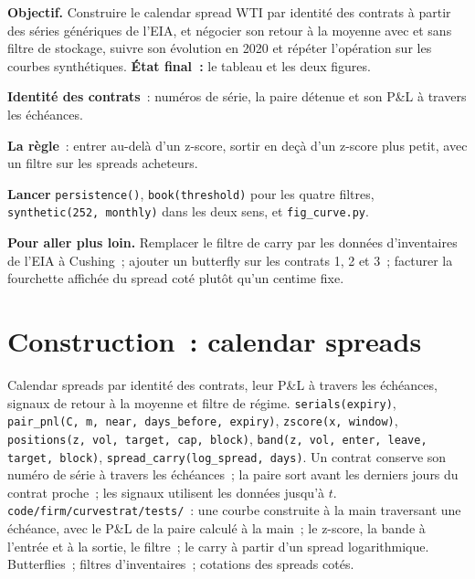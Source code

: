 \begin{tutorial}
\textbf{Objectif.} Construire le calendar spread WTI par identité des contrats à partir des séries génériques de l'EIA, et négocier son retour à la moyenne avec et sans
filtre de stockage, suivre son évolution en 2020 et répéter l'opération sur les courbes synthétiques. \textbf{État final~:} le tableau et les deux figures.
\begin{tutsteps}
\item \textbf{Identité des contrats}~: numéros de série, la paire détenue et son P\&L à travers les échéances.
\label{lst:s1:calendar-spreads-and-curve-trades:pair}
\item \textbf{La règle}~: entrer au-delà d'un z-score, sortir en deçà d'un z-score plus petit, avec un filtre sur les spreads acheteurs.
\label{lst:s1:calendar-spreads-and-curve-trades:band}
\item \textbf{Lancer} \texttt{persistence()}, \texttt{book(threshold)} pour les quatre filtres, \texttt{synthetic(252, monthly)} dans les deux sens, et
\texttt{fig\_curve.py}.
\end{tutsteps}
\textbf{Pour aller plus loin.} Remplacer le filtre de carry par les données d'inventaires de l'EIA à Cushing~; ajouter un butterfly sur les contrats 1, 2 et 3~; facturer la
fourchette affichée du spread coté plutôt qu'un centime fixe.
\end{tutorial}

\section{Construction~: calendar spreads}\label{bld:s1:calendar-spreads-and-curve-trades:curvestrat}

\begin{build}
 Calendar spreads par identité des contrats, leur P\&L à travers les échéances, signaux de retour à la moyenne et filtre de régime.
 \texttt{serials(expiry)}, \texttt{pair\_pnl(C, m, near, days\_before, expiry)}, \texttt{zscore(x, window)},
\texttt{positions(z, vol, target, cap, block)}, \texttt{band(z, vol, enter, leave, target, block)}, \texttt{spread\_carry(log\_spread, days)}.
 Un contrat conserve son numéro de série à travers les échéances~; la paire sort avant les derniers jours du contrat proche~; les signaux utilisent les données jusqu'à $t$.
 \texttt{code/firm/curvestrat/tests/}~: une courbe construite à la main traversant une échéance, avec le P\&L de la paire calculé à la main~; le z-score, la
bande à l'entrée et à la sortie, le filtre~; le carry à partir d'un spread logarithmique.
 Butterflies~; filtres d'inventaires~; cotations des spreads cotés.
\end{build}

